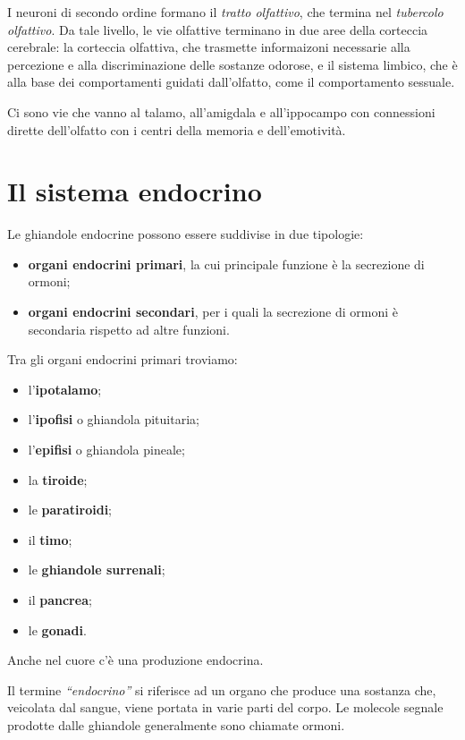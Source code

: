 \documentclass[]{article}
\begin{document}
I neuroni di secondo ordine formano il \emph{tratto olfattivo}, che
termina nel \emph{tubercolo olfattivo}. Da tale livello, le vie
olfattive terminano in due aree della corteccia cerebrale: la corteccia
olfattiva, che trasmette informaizoni necessarie alla percezione e alla
discriminazione delle sostanze odorose, e il sistema limbico, che è alla
base dei comportamenti guidati dall'olfatto, come il comportamento
sessuale.

Ci sono vie che vanno al talamo, all'amigdala e all'ippocampo con
connessioni dirette dell'olfatto con i centri della memoria e
dell'emotività.

\section{Il sistema endocrino}\label{il-sistema-endocrino}

Le ghiandole endocrine possono essere suddivise in due tipologie:

\begin{itemize}
\itemsep1pt\parskip0pt
\item
  \textbf{organi endocrini primari}, la cui principale funzione è la
  secrezione di ormoni;
\item
  \textbf{organi endocrini secondari}, per i quali la secrezione di
  ormoni è secondaria rispetto ad altre funzioni.
\end{itemize}

Tra gli organi endocrini primari troviamo:

\begin{itemize}
\itemsep1pt\parskip0pt
\item
  l'\textbf{ipotalamo};
\item
  l'\textbf{ipofisi} o ghiandola pituitaria;
\item
  l'\textbf{epifisi} o ghiandola pineale;
\item
  la \textbf{tiroide};
\item
  le \textbf{paratiroidi};
\item
  il \textbf{timo};
\item
  le \textbf{ghiandole surrenali};
\item
  il \textbf{pancrea};
\item
  le \textbf{gonadi}.
\end{itemize}

Anche nel cuore c'è una produzione endocrina.

Il termine \emph{``endocrino''} si riferisce ad un organo che produce
una sostanza che, veicolata dal sangue, viene portata in varie parti del
corpo. Le molecole segnale prodotte dalle ghiandole generalmente sono
chiamate ormoni.
\end{document}

